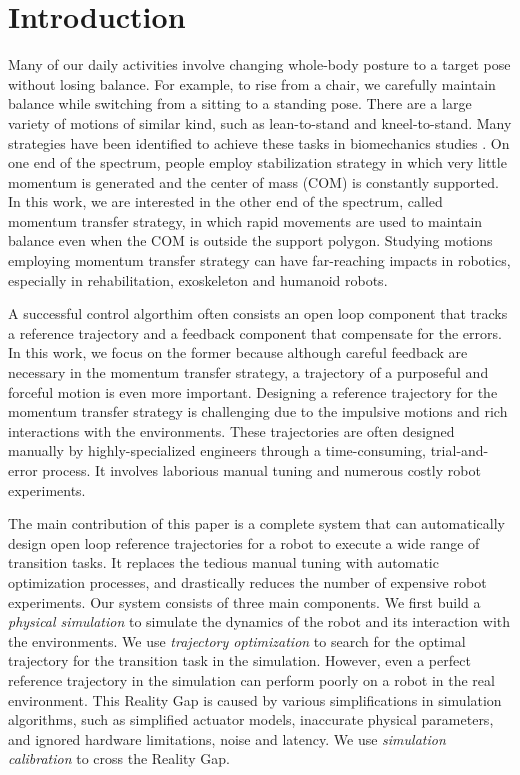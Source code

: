 \section{Introduction}

Many of our daily activities involve changing whole-body posture to a target pose without losing balance. For example, to rise from a chair, we carefully maintain balance while switching from a sitting to a standing pose. There are a large variety of motions of similar kind, such as lean-to-stand and kneel-to-stand. Many strategies have been identified to achieve these tasks in biomechanics studies \cite{schenkman:1990,riley:1991,hughes:1994,hughes:1996}. On one end of the spectrum, people employ stabilization strategy in which very little momentum is generated and the center of mass (COM) is constantly supported. In this work, we are interested in the other end of the spectrum, called momentum transfer strategy, in which rapid movements are used to maintain balance even when the COM is outside the support polygon. Studying motions employing momentum transfer strategy can have far-reaching impacts in robotics, especially in rehabilitation, exoskeleton and humanoid robots. 

A successful control algorthim often consists an open loop component that tracks a reference trajectory and a feedback component that compensate for the errors. In this work, we focus on the former because although careful feedback are necessary in the momentum transfer strategy, a trajectory of a purposeful and forceful motion is even more important. Designing a reference trajectory for the momentum transfer strategy is challenging due to the impulsive motions and rich interactions with the environments. These trajectories are often designed manually by highly-specialized engineers through a time-consuming, trial-and-error process. It involves laborious manual tuning and numerous costly robot experiments.

The main contribution of this paper is a complete system that can automatically design open loop reference trajectories for a robot to execute a wide range of transition tasks. It replaces the tedious manual tuning with automatic optimization processes, and drastically reduces the number of expensive robot experiments. Our system consists of three main components. We first build a \emph{physical simulation} to simulate the dynamics of the robot and its interaction with the environments. We use \emph{trajectory optimization} to search for the optimal trajectory for the transition task in the simulation. However, even a perfect reference trajectory in the simulation can perform poorly on a robot in the real environment. This Reality Gap \cite{Jakobi95} is caused by various simplifications in simulation algorithms, such as simplified actuator models, inaccurate physical parameters, and ignored hardware limitations, noise and latency. We use \emph{simulation calibration} to cross the Reality Gap.

